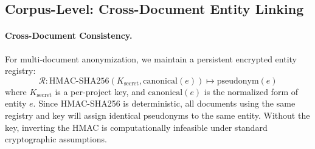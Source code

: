 \documentclass[11pt, a4paper]{article}
\begin{document}
\subsection{Corpus-Level: Cross-Document Entity Linking}

\paragraph{Cross-Document Consistency.}
For multi-document anonymization, we maintain a persistent encrypted entity registry:
\begin{equation}
\mathcal{R}: \text{HMAC-SHA256}(K_{\text{secret}}, \text{canonical}(e)) \mapsto \text{pseudonym}(e)
\end{equation}
where $K_{\text{secret}}$ is a per-project key, and $\text{canonical}(e)$ is the normalized form of entity $e$. Since HMAC-SHA256 is deterministic, all documents using the same registry and key will assign identical pseudonyms to the same entity. Without the key, inverting the HMAC is computationally infeasible under standard cryptographic assumptions.
\end{document}
